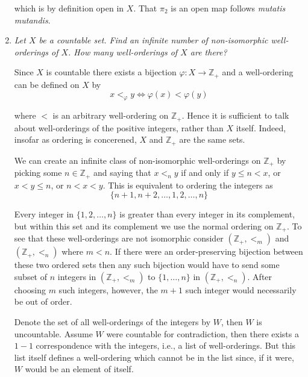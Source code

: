 \documentclass[letterpaper, 11pt]{article}
\newcommand{\Z}{\mathbb{Z}}
\begin{document}
\begin{enumerate}
which is by definition open in $X$.  That $\pi_2$ is an open map follows \emph{mutatis mutandis}.

\item \emph{Let $X$ be a countable set.  Find an infinite number of non-isomorphic well-orderings of $X$.  How many well-orderings of $X$ are there?}

Since $X$ is countable there exists a bijection $\varphi: X \rightarrow \Z_+$ and a well-ordering can be defined on $X$ by
\[
x <_\varphi y \Leftrightarrow \varphi(x) < \varphi(y)
\]

where $<$ is an arbitrary well-ordering on $\Z_+$.  Hence it is sufficient to talk about well-orderings of the positive integers, rather than $X$ itself.  Indeed, insofar as ordering is concerened, $X$ and $\Z_+$ are the same sets.

We can create an infinite class of non-isomorphic well-orderings on $\Z_+$ by picking some $n \in \Z_+$ and saying that $x <_n y$ if and only if $y \leq n < x$, or $x < y \leq n$, or $n < x < y$.  This is equivalent to ordering the integers as
\[
\{n+1, n+2, \ldots, 1,2,\ldots,n\}
\]

Every integer in $\{1,2,\ldots, n\}$ is greater than every integer in its complement, but within this set and its complement we use the normal ordering on $\Z_+$.  To see that these well-orderings are not isomorphic consider $(\Z_+, <_m)$ and $(\Z_+, <_n)$ where $m < n$.  If there were an order-preserving bijection between these two ordered sets then any such bijection would have to send some subset of $n$ integers in $(\Z_+, <_m)$ to $\{1,\ldots,n\}$ in $(\Z_+, <_n)$.  After choosing $m$ such integers, however, the $m+1$ such integer would necessarily be out of order.

Denote the set of all well-orderings of the integers by $W$, then $W$ is uncountable.  Assume $W$ were countable for contradiction, then there exists a $1-1$ correspondence with the integers, i.e., a list of well-orderings.  But this list itself defines a well-ordering which cannot be in the list since, if it were, $W$ would be an element of itself.

\end{enumerate}
\end{document}
